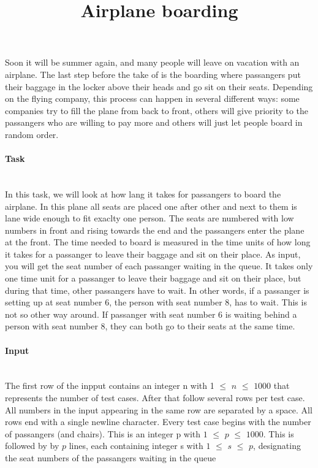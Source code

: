 \documentclass[10pt,a4paper]{article}
\begin{document}
\title{Airplane boarding}
\maketitle

Soon it will be summer again, and many people will leave on vacation with an airplane. The last step before the take of is the boarding where passangers put their baggage in the locker above their heads and go sit on their seats. Depending on the flying company, this process can happen in several different ways: some companies try to fill the plane from back to front, others will give priority to the passangers who are willing to pay more and others will just let people board in random order.

\paragraph{Task\\ \\}

In this task, we will look at how lang it takes for passangers to board the airplane. In this plane all seats are placed one after other and next to them is lane wide enough to fit exaclty one person. The seats are numbered with low numbers in front and rising towards the end and the passangers enter the plane at the front. The time needed to board is measured in the time units of how long it takes for a passanger to leave their baggage and sit on their place. As input, you will get the seat number of each passanger waiting in the queue. It takes only one time unit for a passanger to leave their baggage and sit on their place, but during that time, other passangers have to wait. In other words, if a passanger is setting up at seat number 6, the person with seat number 8, has to wait. This is not so other way around. If passanger with seat number 6 is waiting behind a person with seat number 8, they can both go to their seats at the same time.

\paragraph{Input\\ \\}

The first row of the inpput contains an integer n with 1 $\leq$ $n$ $\leq$ $1000$ that represents the number of test cases. After that follow several rows per test case. All numbers in the input appearing in the same row are separated by a space. All rows end with a single newline character. Every test case begins with the number of passangers (and chairs). This is an integer p with $1$ $\leq$ $p$ $\leq$ $1000$. This is followed by by $p$ lines, each containing integer s with $1$ $\leq$ $s$ $\leq$ $p$, designating the seat numbers of the passangers waiting in the queue
	
\end{document}
